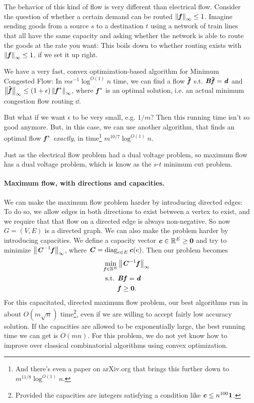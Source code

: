 The behavior of this kind of flow is very different than electrical
flow. Consider the question of whether a certain demand can be routed
$\left\| \boldsymbol{\mathit{f}} \right\|_{\infty} \leq 1$.
Imagine sending goods from a source $s$ to a destination $t$ using a
network of train lines that all have the
same capacity and asking whether the network is able to route the
goods at the rate you want: This boils down to whether routing exists
with $\left\| \boldsymbol{\mathit{f}} \right\|_{\infty} \leq 1$, if we set it up right.

We have a very fast, convex optimization-based algorithm for Minimum Congested Flow:
In $m \epsilon^{-1} \log^{O(1)} n$ time, we can find a flow $\boldsymbol{\tilde{\mathit{f}}}$
s.t. $\boldsymbol{\mathit{B}} \boldsymbol{\tilde{\mathit{f}}} = \boldsymbol{\mathit{d}}$ and $\left\| \boldsymbol{\tilde{\mathit{f}}} \right\|_{\infty} \leq
(1+\epsilon)\left\| \boldsymbol{\mathit{f}}^* \right\|_{\infty}$, where $\boldsymbol{\mathit{f}}^*$ is an optimal solution, i.e. an
actual minimum congestion flow routing $\dd$.

But what if we want $\epsilon$ to be very small, e.g. $1/m$? Then this running
time isn't so good anymore.
But, in this case, we can use another algorithm, that finds an optimal
flow $\boldsymbol{\mathit{f}}^*$ \emph{exactly}, in time\footnote{And there's even a paper on arXiv.org that brings this further
  down to $m^{11/8} \log^{O(1)} n$.} $m^{10/7} \log^{O(1)} n $.

Just as the electrical flow problem had a dual voltage problem, so
maximum flow has a dual voltage problem, which is know as the
$s$-$t$ minimum cut problem.

\paragraph{Maximum flow, with directions and capacities.}
We can make the maximum flow problem harder by introducing directed
edges: To do so, we allow edges in both directions to exist between a
vertex to exist, and we require that that flow on a directed edge is
always non-negative. So now $G=(V,E)$ is a directed graph.
We can also make the problem harder by introducing capacities.
We define a capacity vector $\boldsymbol{\mathit{c}} \in \mathbb{R}^E \geq \boldsymbol{0}$ and try to minimize $\left\| \boldsymbol{\mathit{C}}^{-1} \boldsymbol{\mathit{f}} \right\|_{\infty}$, where $\boldsymbol{\mathit{C}} =
\operatorname*{diag}_{e \in E}\boldsymbol{\mathit{c}}(e)$.
Then our problem becomes
\begin{align*}
\min_{\boldsymbol{\mathit{f}} \in \mathbb{R}^E } & \left\| \boldsymbol{\mathit{C}}^{-1} \boldsymbol{\mathit{f}} \right\|_{\infty} \\
  \textrm{s.t. } &  \boldsymbol{\mathit{B}} \boldsymbol{\mathit{f}} = \boldsymbol{\mathit{d}}\\
                     &  \boldsymbol{\mathit{f}} \geq \boldsymbol{0}.
\end{align*}
For this capacitated, directed maximum flow problem, our best
algorithms run in about $O( m \sqrt{n} )$ time\footnote{Provided the
  capacities are integers satisfying a condition like $\boldsymbol{\mathit{c}} \leq n^{100} \boldsymbol{1}$.}, even if we are willing to
accept fairly low accuracy solution.
If the capacities are allowed to be exponentially large, the best
running time we can get is $O(m n)$.
For this problem, we do not yet know how to improve over classical
combinatorial algorithms using convex optimization.

